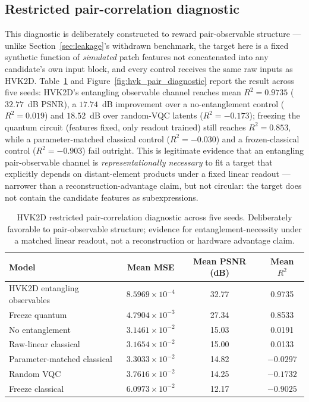 \documentclass[journal]{IEEEtran}
\begin{document}
\subsection{Restricted pair-correlation diagnostic}
This diagnostic is deliberately constructed to reward pair-observable structure --- unlike Section~\ref{sec:leakage}'s withdrawn benchmark, the target here is a fixed synthetic function of \emph{simulated} patch features not concatenated into any candidate's own input block, and every control receives the same raw inputs as HVK2D. Table~\ref{tab:hvk_pair_diagnostic} and Figure~\ref{fig:hvk_pair_diagnostic} report the result across five seeds: HVK2D's entangling observable channel reaches mean $R^2=0.9735$ ($32.77$~dB PSNR), a $17.74$~dB improvement over a no-entanglement control ($R^2=0.019$) and $18.52$~dB over random-VQC latents ($R^2=-0.173$); freezing the quantum circuit (features fixed, only readout trained) still reaches $R^2=0.853$, while a parameter-matched classical control ($R^2=-0.030$) and a frozen-classical control ($R^2=-0.903$) fail outright. This is legitimate evidence that an entangling pair-observable channel is \emph{representationally necessary} to fit a target that explicitly depends on distant-element products under a fixed linear readout --- narrower than a reconstruction-advantage claim, but not circular: the target does not contain the candidate features as subexpressions.

\begin{table}[t]
\centering
\caption{HVK2D restricted pair-correlation diagnostic across five seeds. Deliberately favorable to pair-observable structure; evidence for entanglement-necessity under a matched linear readout, not a reconstruction or hardware advantage claim.}
\label{tab:hvk_pair_diagnostic}
\scriptsize
\begin{tabular}{lccc}
\toprule
Model & Mean MSE & Mean PSNR (dB) & Mean $R^2$ \\
\midrule
HVK2D entangling observables & $8.5969\times10^{-4}$ & 32.77 & 0.9735 \\
Freeze quantum & $4.7904\times10^{-3}$ & 27.34 & 0.8533 \\
No entanglement & $3.1461\times10^{-2}$ & 15.03 & 0.0191 \\
Raw-linear classical & $3.1654\times10^{-2}$ & 15.00 & 0.0133 \\
Parameter-matched classical & $3.3033\times10^{-2}$ & 14.82 & $-0.0297$ \\
Random VQC & $3.7616\times10^{-2}$ & 14.25 & $-0.1732$ \\
Freeze classical & $6.0973\times10^{-2}$ & 12.17 & $-0.9025$ \\
\bottomrule
\end{tabular}
\end{table}
\end{document}
